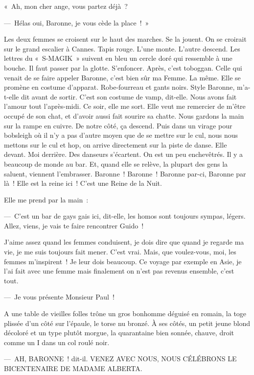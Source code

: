 \documentclass[french,twoside]{book} %
\begin{document}
« Ah, mon cher ange, vous partez déjà ?\par
— Hélas oui, Baronne, je vous cède la place ! »\par
Les deux femmes se croisent sur le haut des marches. Se la jouent. On se croirait sur le grand escalier à Cannes. Tapis rouge. L’une monte. L’autre descend. Les lettres du « S-MAGIK » suivent en bleu un cercle doré qui ressemble à une bouche. Il faut passer par la glotte. S’enfoncer. Après, c’est toboggan. Celle qui venait de se faire appeler Baronne, c’est bien sûr ma Femme. La même. Elle se promène en costume d’apparat. Robe-fourreau et gants noirs. Style Baronne, m’a-t-elle dit avant de sortir. C’est son costume de vamp, dit-elle. Nous avons fait l’amour tout l’après-midi. Ce soir, elle me sort. Elle veut me remercier de m’être occupé de son chat, et d’avoir aussi fait sourire sa chatte. Nous gardons la main sur la rampe en cuivre. De notre côté, ça descend. Puis dans un virage pour bobsleigh où il n’y a pas d’autre moyen que de se mettre sur le cul, nous nous mettons sur le cul et hop, on arrive directement sur la piste de danse. Elle devant. Moi derrière. Des danseurs s’écartent. On est un peu enchevêtrés. Il y a beaucoup de monde au bar. Et, quand elle se relève, la plupart des gens la saluent, viennent l’embrasser. Baronne ! Baronne ! Baronne par-ci, Baronne par là ! Elle est la reine ici ! C’est une Reine de la Nuit.\par
Elle me prend par la main :\par
— C’est un bar de gays gais ici, dit-elle, les homos sont toujours sympas, légers. Allez, viens, je vais te faire rencontrer Guido !\par
J’aime assez quand les femmes conduisent, je dois dire que quand je regarde ma vie, je me suis toujours fait mener. C’est vrai. Mais, que voulez-vous, moi, les femmes m’inspirent ! Je leur dois beaucoup. Ce voyage par exemple en Asie, je l’ai fait avec une femme mais finalement on n’est pas revenus ensemble, c’est tout.\par
— Je vous présente Monsieur Paul !\par
A une table de vieilles folles trône un gros bonhomme déguisé en romain, la toge plissée d’un côté sur l’épaule, le torse nu bronzé. À ses côtés, un petit jeune blond décoloré et un type plutôt morgue, la quarantaine bien sonnée, chauve, droit comme un I dans un col roulé noir.\par
— AH, BARONNE ! dit-il. VENEZ AVEC NOUS, NOUS CÉLÉBRONS LE BICENTENAIRE DE MADAME ALBERTA.\par
\end{document}
